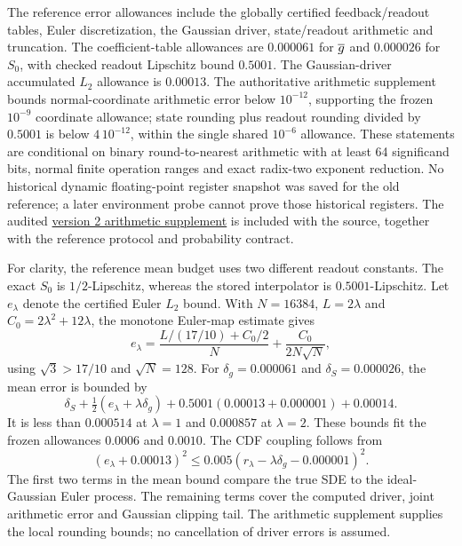 The reference error allowances include the globally certified feedback/readout tables, Euler discretization, the Gaussian driver, state/readout arithmetic and truncation. The coefficient-table allowances are $0.000061$ for $\overline g$ and $0.000026$ for $S_0$, with checked readout Lipschitz bound $0.5001$. The Gaussian-driver accumulated $L_2$ allowance is $0.00013$. The authoritative arithmetic supplement bounds normal-coordinate arithmetic error below $10^{-12}$, supporting the frozen $10^{-9}$ coordinate allowance; state rounding plus readout rounding divided by $0.5001$ is below $4\,10^{-12}$, within the single shared $10^{-6}$ allowance. These statements are conditional on binary round-to-nearest arithmetic with at least 64 significand bits, normal finite operation ranges and exact radix-two exponent reduction. No historical dynamic floating-point register snapshot was saved for the old reference; a later environment probe cannot prove those historical registers. The audited \href{https://github.com/19991111/huaweipro-tpht-linux/blob/943485ae2be727404deaf50a1dc8c5206782fba2/research/paper_sde_posthoc_erratum_20261017/received/ARITHMETIC_SUPPLEMENT.v2.en.txt}{version 2 arithmetic supplement} is included with the source, together with the reference protocol and probability contract.

For clarity, the reference mean budget uses two different readout constants. The exact $S_0$ is $1/2$-Lipschitz, whereas the stored interpolator is $0.5001$-Lipschitz. Let $e_\lambda$ denote the certified Euler $L_2$ bound. With $N=16384$, $L=2\lambda$ and $C_0=2\lambda^2+12\lambda$, the monotone Euler-map estimate gives
\[
 e_\lambda=\frac{L/(17/10)+C_0/2}{N}
            +\frac{C_0}{2N\sqrt N},
\]
using $\sqrt3>17/10$ and $\sqrt N=128$. For $\delta_g=0.000061$ and $\delta_S=0.000026$, the mean error is bounded by
\[
 \delta_S+\tfrac12(e_\lambda+\lambda\delta_g)
 +0.5001(0.00013+0.000001)+0.00014.
\]
It is less than $0.000514$ at $\lambda=1$ and $0.000857$ at $\lambda=2$. These bounds fit the frozen allowances $0.0006$ and $0.0010$. The CDF coupling follows from
\[
 (e_\lambda+0.00013)^2
 \le0.005(r_\lambda-\lambda\delta_g-0.000001)^2.
\]
The first two terms in the mean bound compare the true SDE to the ideal-Gaussian Euler process. The remaining terms cover the computed driver, joint arithmetic error and Gaussian clipping tail. The arithmetic supplement supplies the local rounding bounds; no cancellation of driver errors is assumed.
